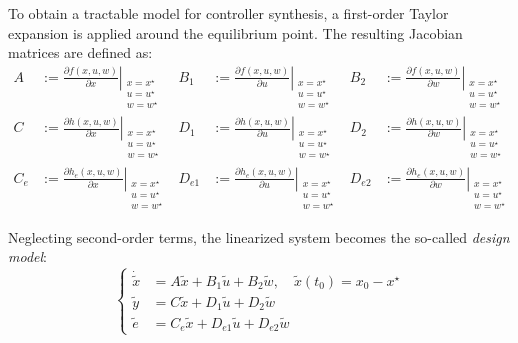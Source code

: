 \documentclass[]{report}
\begin{document}
	
	To obtain a tractable model for controller synthesis, a first-order Taylor expansion is applied around the equilibrium point. The resulting Jacobian matrices are defined as:
	\begin{equation}
		\label{eq:jacobians_compact_matrix}
		\begin{aligned}
			A &:= \left. \frac{\partial f(x, u, w)}{\partial x} \right|_{\substack{x = x^\star \\ u = u^\star \\ w = w^\star}} & B_1 &:= \left. \frac{\partial f(x, u, w)}{\partial u} \right|_{\substack{x = x^\star \\ u = u^\star \\ w = w^\star}} & B_2 &:= \left. \frac{\partial f(x, u, w)}{\partial w} \right|_{\substack{x = x^\star \\ u = u^\star \\ w = w^\star}} \\
			C &:= \left. \frac{\partial h(x, u, w)}{\partial x} \right|_{\substack{x = x^\star \\ u = u^\star \\ w = w^\star}} & D_1 &:= \left. \frac{\partial h(x, u, w)}{\partial u} \right|_{\substack{x = x^\star \\ u = u^\star \\ w = w^\star}} & D_2 &:= \left. \frac{\partial h(x, u, w)}{\partial w} \right|_{\substack{x = x^\star \\ u = u^\star \\ w = w^\star}} \\
			C_e &:= \left. \frac{\partial h_e(x, u, w)}{\partial x} \right|_{\substack{x = x^\star \\ u = u^\star \\ w = w^\star}} & D_{e1} &:= \left. \frac{\partial h_e(x, u, w)}{\partial u} \right|_{\substack{x = x^\star \\ u = u^\star \\ w = w^\star}} & D_{e2} &:= \left. \frac{\partial h_e(x, u, w)}{\partial w} \right|_{\substack{x = x^\star \\ u = u^\star \\ w = w^\star}}
		\end{aligned}
	\end{equation}
	
	
	
	
	
	Neglecting second-order terms, the linearized system becomes the so-called \textit{design model}:
	\begin{equation}
		\label{eq:linearized_system}
		\left\{
		\begin{aligned}
			\dot{\tilde{x}} &= A \tilde{x} + B_1 \tilde{u} + B_2 \tilde{w}, \quad \tilde{x}(t_0) = x_0 - x^\star \\
			\tilde{y} &= C \tilde{x} + D_1 \tilde{u} + D_2 \tilde{w} \\
			\tilde{e} &= C_e \tilde{x} + D_{e1} \tilde{u} + D_{e2} \tilde{w}
		\end{aligned}
		\right.
	\end{equation}
	
\end{document}
